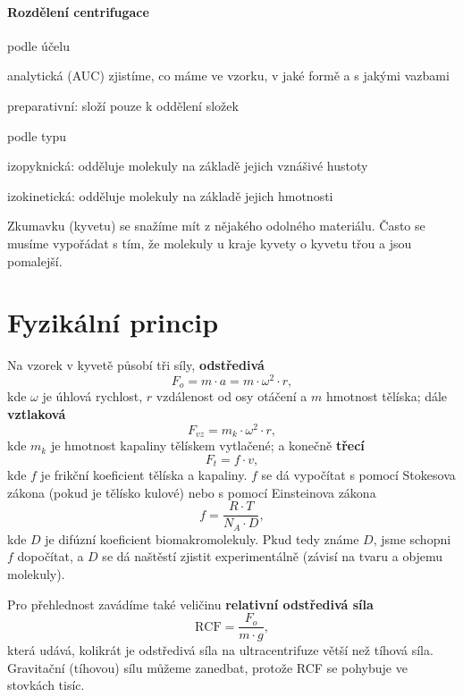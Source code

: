 \documentclass[DIV=8]{scrreprt}
\begin{document}
\paragraph{Rozdělení centrifugace}
\begin{myItemize}[nosep]
    \item podle účelu
\begin{myItemize}[nosep]
    \item analytická (AUC) zjistíme, co máme ve vzorku, v jaké formě a s jakými vazbami
    \item preparativní: složí pouze k oddělení složek
\end{myItemize}

    \item podle typu
\begin{myItemize}[nosep]
    \item izopyknická: odděluje molekuly na základě jejich vznášivé hustoty
    \item izokinetická: odděluje molekuly na základě jejich hmotnosti
\end{myItemize}

\end{myItemize}



Zkumavku (kyvetu) se snažíme mít z nějakého odolného materiálu. Často se musíme vypořádat s tím, že molekuly u kraje kyvety o kyvetu třou a jsou pomalejší.

\section{Fyzikální princip} \label{Fyzikální princip} \FloatBarrier


Na vzorek v kyvetě působí tři síly, \textbf{odstředivá}
\[F_o = m \cdot a = m \cdot \omega^2 \cdot r,\]
kde \(\omega\) je úhlová rychlost, \(r\) vzdálenost od osy otáčení a \(m\) hmotnost tělíska; dále \textbf{vztlaková}
\[F_{vz} = m_k \cdot \omega^2 \cdot r,\]
kde \(m_k\) je hmotnost kapaliny tělískem vytlačené; a konečně \textbf{třecí}
\[F_t = f \cdot v,\]
kde \(f\) je frikční koeficient tělíska a kapaliny. \(f\) se dá vypočítat s pomocí Stokesova zákona (pokud je tělísko kulové) nebo s pomocí Einsteinova zákona
\[f = \frac{R \cdot T}{N_A \cdot D},\]
kde \(D\) je difúzní koeficient biomakromolekuly. Pkud tedy známe \(D\), jsme schopni \(f\) dopočítat, a \(D\) se dá naštěstí zjistit experimentálně (závisí na tvaru a objemu molekuly).

Pro přehlednost zavádíme také veličinu \textbf{relativní odstředivá síla}
\[\text{RCF} = \frac{F_o}{m \cdot g},\]
která udává, kolikrát je odstředivá síla na ultracentrifuze větší než tíhová síla. Gravitační (tíhovou) sílu můžeme zanedbat, protože RCF se pohybuje ve stovkách tisíc.
\end{document}
